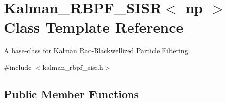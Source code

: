 \hypertarget{classKalman__RBPF__SISR}{}\section{Kalman\+\_\+\+R\+B\+P\+F\+\_\+\+S\+I\+SR$<$ np $>$ Class Template Reference}
\label{classKalman__RBPF__SISR}


A base-\/class for Kalman Rao-\/\+Blackwellized Particle Filtering.  




{\ttfamily \#include $<$kalman\+\_\+rbpf\+\_\+sisr.\+h$>$}

\subsection*{Public Member Functions}
